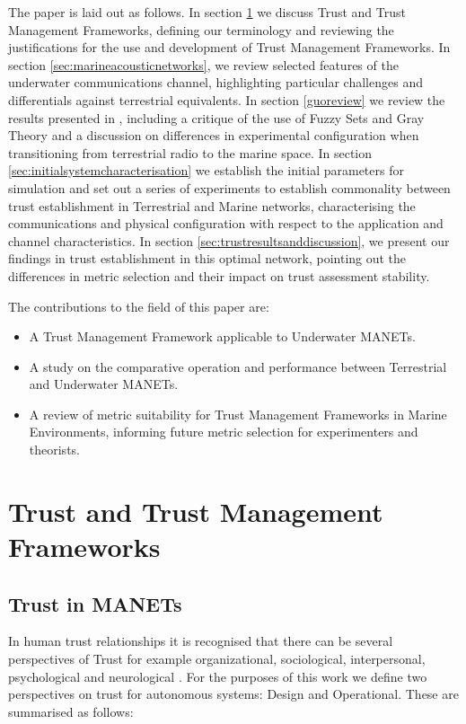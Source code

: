 \documentclass[runningheads,a4paper]{llncs}
\begin{document}
The paper is laid out as follows.
In section \ref{sec:trustandtmfs} we discuss Trust and Trust Management Frameworks, defining our terminology and reviewing the justifications for the use and development of Trust Management Frameworks.
In section \ref{sec:marineacousticnetworks}, we review selected features of the underwater communications channel, highlighting particular challenges and differentials against terrestrial equivalents.
In section \ref{guoreview} we review the results presented in \cite{Guo11}, including a critique of the use of Fuzzy Sets and Gray Theory and a discussion on differences in experimental configuration when transitioning from terrestrial radio to the marine space.
In section \ref{sec:initialsystemcharacterisation} we establish the initial parameters for simulation and set out a series of experiments to establish commonality between trust establishment in Terrestrial and Marine networks, characterising the communications and physical configuration with respect to the application and channel characteristics.
In section \ref{sec:trustresultsanddiscussion}, we present our findings in trust establishment in this optimal network, pointing out the differences in metric selection and their impact on trust assessment stability.

The contributions to the field of this paper are:
\begin{itemize}
  \item A Trust Management Framework applicable to Underwater MANETs.
  \item A study on the comparative operation and performance between Terrestrial and Underwater MANETs.
  \item A review of metric suitability for Trust Management Frameworks in Marine Environments, informing future metric selection for experimenters and theorists.
\end{itemize}

\section{Trust and Trust Management Frameworks}\label{sec:trustandtmfs}

\subsection{Trust in MANETs}\label{sec:trustinmanets}

In human trust relationships it is recognised that there can be several perspectives of Trust for example organizational, sociological, interpersonal, psychological and neurological \cite{Lee2004}.
For the purposes of this work we define two perspectives on trust for autonomous systems: Design and Operational. These are summarised as follows:
\end{document}
